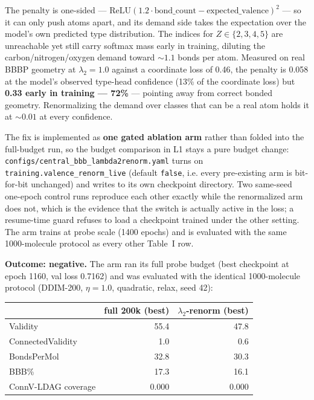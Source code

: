 \documentclass[12pt, a4paper]{article}
\begin{document}
The penalty is one-sided --- $\mathrm{ReLU}(1.2 \cdot \mathrm{bond\_count} -
\mathrm{expected\_valence})^2$ --- so it can only push atoms apart, and its
demand side takes the expectation over the model's own predicted type
distribution. The indices for $Z \in \{2,3,4,5\}$ are unreachable yet still
carry softmax mass early in training, diluting the carbon/nitrogen/oxygen
demand toward ${\sim}1.1$ bonds per atom. Measured on real BBBP geometry at
$\lambda_2 = 1.0$ against a coordinate loss of 0.46, the penalty is 0.058 at
the model's observed type-head confidence (13\% of the coordinate loss) but
\textbf{0.33 early in training --- 72\%} --- pointing away from correct bonded
geometry. Renormalizing the demand over classes that can be a real atom holds
it at ${\sim}0.01$ at every confidence.

The fix is implemented as \textbf{one gated ablation arm} rather than folded
into the full-budget run, so the budget comparison in L1 stays a pure budget
change: \texttt{configs/central\_bbb\_lambda2renorm.yaml} turns on
\texttt{training.valence\_renorm\_live} (default \texttt{false}, i.e. every
pre-existing arm is bit-for-bit unchanged) and writes to its own checkpoint
directory. Two same-seed one-epoch control runs reproduce each other exactly
while the renormalized arm does not, which is the evidence that the switch is
actually active in the loss; a resume-time guard refuses to load a checkpoint
trained under the other setting. The arm trains at probe scale (1400 epochs)
and is evaluated with the same 1000-molecule protocol as every other Table~I
row.

\textbf{Outcome: negative.} The arm ran its full probe budget (best
checkpoint at epoch 1160, val loss 0.7162) and was evaluated with the identical
1000-molecule protocol (DDIM-200, $\eta=1.0$, quadratic, relax, seed 42):

\begin{center}
\begin{tabular}{lrr}
\toprule
 & full 200k (best) & $\lambda_2$-renorm (best) \\
\midrule
Validity             & 55.4 & 47.8 \\
ConnectedValidity    & 1.0  & 0.6 \\
BondsPerMol          & 32.8 & 30.3 \\
BBB\%                & 17.3 & 16.1 \\
ConnV-LDAG coverage  & 0.000 & 0.000 \\
\bottomrule
\end{tabular}
\end{center}
\end{document}
